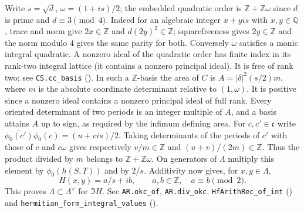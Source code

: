Write $s=\sqrt d$, $\omega=(1+is)/2$; the embedded quadratic order is
$\mathbb Z+\mathbb Z\omega$ since $d$ is prime and $d\equiv3\pmod4$.
Indeed for an algebraic integer $x+yis$ with $x,y\in\mathbb Q$, trace and
norm give $2x\in\mathbb Z$ and $d(2y)^2\in\mathbb Z$; squarefreeness gives
$2y\in\mathbb Z$ and the norm modulo $4$ gives the same parity for both.
Conversely $\omega$ satisfies a monic integral quadratic.
A nonzero ideal of the quadratic order has finite index in its
rank-two integral lattice (it contains a nonzero principal ideal).
It is free of rank two; see \nolinkurl{CS.cc_basis}
(). In such a $\mathbb Z$-basis the area of $C$ is
$A=|\delta|^2(s/2)m$, where $m$ is the absolute coordinate determinant
relative to $(1,\omega)$. It is positive since a nonzero ideal contains
a nonzero principal ideal of full rank. Every oriented determinant of two
periods is an integer multiple of $A$, and a basis attains $A$ up to sign,
as required by the infimum defining area. For $c,c'\in\mathfrak c$
write $\overline{\phi_0(c')}\phi_0(c)=(u+vis)/2$. Taking determinants
of the periods of $c'$ with those of $c$ and $c\omega$ gives respectively
$v/m\in\mathbb Z$ and $(u+v)/(2m)\in\mathbb Z$.
Thus the product divided by $m$ belongs to $\mathbb Z+\mathbb Z\omega$.
On generators of $\Lambda$ multiply this element by $\phi_0(h(S,T))$
and by $2/s$. Additivity now gives, for $x,y\in\Lambda$,
\[
 H(x,y)=a/s+ib,\qquad a,b\in\mathbb Z,\quad a\equiv b\pmod2.
\]
This proves $\Lambda\subset\Lambda^\vee$ for $\Im H$. See
\nolinkurl{AR.okc_of}, \nolinkurl{AR.div_okc}, \nolinkurl{HfArithRec_of_int}
() and
\nolinkurl{hermitian_form_integral_values} ().

